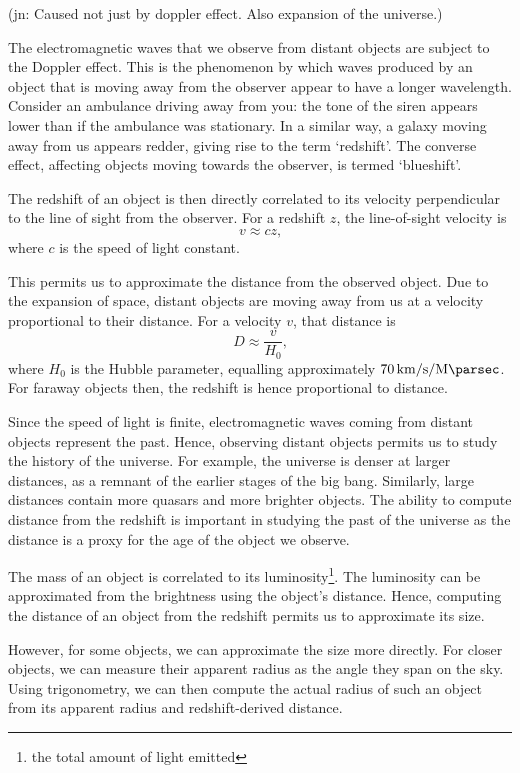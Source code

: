 \documentclass[11pt,twoside,openright]{report}
\newcommand\jn[1]{{\color{red}(jn: #1)}}
\begin{document}
  \jn{Caused not just by doppler effect. Also expansion of the universe.}

  The electromagnetic waves that we observe from distant objects are subject to the Doppler effect. This is the phenomenon by which waves produced by an object that is moving away from the observer appear to have a longer wavelength. Consider an ambulance driving away from you: the tone of the siren appears lower than if the ambulance was stationary. In a similar way, a galaxy moving away from us appears redder, giving rise to the term `redshift'. The converse effect, affecting objects moving towards the observer, is termed `blueshift'.

  The redshift of an object is then directly correlated to its velocity perpendicular to the line of sight from the observer. For a redshift $z$, the line-of-sight velocity is\[
      v \approx cz \text{,}
  \] where $c$ is the speed of light constant.

  This permits us to approximate the distance from the observed object. Due to the expansion of space, distant objects are moving away from us at a velocity proportional to their distance. For a velocity $v$, that distance is \[
      D \approx \frac{v}{H_0} \text{,}
  \] where $H_0$ is the Hubble parameter, equalling approximately $\SI{70}{\kilo\meter\per\second\per\mega\parsec}$. For faraway objects then, the redshift is hence proportional to distance.

  Since the speed of light is finite, electromagnetic waves coming from distant objects represent the past. Hence, observing distant objects permits us to study the history of the universe. For example, the universe is denser at larger distances, as a remnant of the earlier stages of the big bang. Similarly, large distances contain more quasars and more brighter objects. The ability to compute distance from the redshift is important in studying the past of the universe as the distance is a proxy for the age of the object we observe.

  The mass of an object is correlated to its luminosity\footnote{the total amount of light emitted}. The luminosity can be approximated from the brightness using the object's distance. Hence, computing the distance of an object from the redshift permits us to approximate its size.

  However, for some objects, we can approximate the size more directly. For closer objects, we can measure their apparent radius as the angle they span on the sky. Using trigonometry, we can then compute the actual radius of such an object from its apparent radius and redshift-derived distance.
\end{document}
